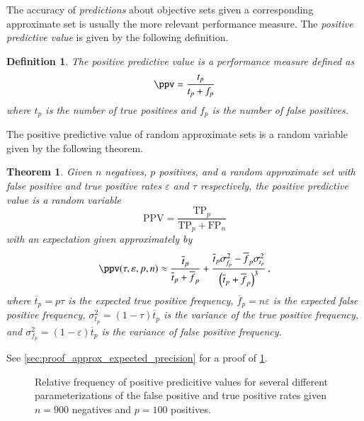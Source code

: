 \documentclass[10pt,final,hidelinks]{article}
\numberwithin{equation}{section}
\newcommand{\p}{p}
\newcommand{\n}{n}
\newcommand{\PPV}{\RV{PPV}}
\newcommand{\TP}{\RV{TP}}
\newcommand{\FP}{\RV{FP}}
\newcommand{\tprate}{\tau}
\newcommand{\fprate}{\varepsilon}
\newcommand{\RV}[1]{\mathrm{#1}}
\newcommand{\envnumstyle}{chapter}
\renewcommand{\envnumstyle}{chapter}
\renewcommand{\envnumstyle}{section}
\theoremstyle{plain}
\newtheorem{theorem}{Theorem}[\envnumstyle]
\newtheorem{definition}{Definition}[\envnumstyle]
\begin{document}
The accuracy of \emph{predictions} about objective sets given a corresponding approximate set is usually the more relevant performance measure.
The \emph{positive predictive value} is given by the following definition.
\begin{definition}
	The \emph{positive predictive value} is a performance measure defined as
	\begin{equation}
	\ppv = \frac{t_p}{t_p + f_p}
	\end{equation}
	where $t_p$ is the number of \emph{true positives} and $f_p$ is the number of \emph{false positives}.
\end{definition}

The positive predictive value of random approximate sets is a random variable given by the following theorem.
\begin{theorem}
	\label{thm:approx_expected_precision}
	Given $\n$ negatives, $\p$ positives, and a random approximate set with false positive and true positive rates $\fprate$ and $\tprate$ respectively, the \emph{positive predictive value} is a random variable
	\begin{equation}
	\PPV = \frac{\TP_{\p}}{\TP_{\p} + \FP_{\n}}
	\end{equation}
	with an \emph{expectation} given \emph{approximately} by
	\begin{equation}
	\label{eq:approx_expected_precision}
	\ppv(\tprate, \fprate, \p, \n) \approx 
	\frac{\overline{t}_\p}{\overline{t}_\p + \overline{f}_\p} +
	\frac{\overline{t}_\p \sigma_{\!f_\p}^2 - \overline{f}_\p 
		\sigma_{\!t_\p}^2}{\left(\overline{t}_\p + \overline{f}_\p\right)^3}\,,
	\end{equation}
	where $\overline{t}_\p = \p \tprate$ is the expected \emph{true positive} frequency, $\overline{f}_\p =  \n \fprate$ is the expected \emph{false positive} frequency, $\sigma_{\!t_\p}^2 = (1-\tprate) \overline{t}_\p$ is the variance of the \emph{true positive} frequency, and $\sigma_{\!f_\p}^2 = (1-\fprate) \overline{t}_\p$ is the variance of \emph{false positive} frequency.
\end{theorem}
See \cref{sec:proof_approx_expected_precision} for a proof of 
\cref{thm:approx_expected_precision}.

\begin{figure}
	\def\svgwidth{\columnwidth/2}
	\centering
	\captionsetup{justification=centering}
	\caption
	{
		Relative frequency of positive predicitive values for several different parameterizations of the false positive and true positive rates given $\n = 900$ negatives and $\p=100$ positives.
	}    
	
	\label{fig:prec_vs_fprate_and_fnrate}
\end{figure}
\end{document}
